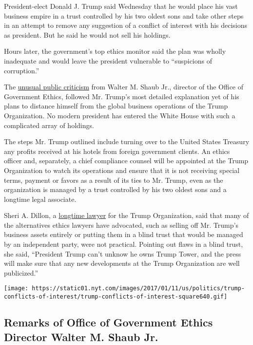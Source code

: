 President-elect Donald J. Trump said Wednesday that he would place his
vast business empire in a trust controlled by his two oldest sons and
take other steps in an attempt to remove any suggestion of a conflict of
interest with his decisions as president. But he said he would not sell
his holdings.

Hours later, the government's top ethics monitor said the plan was
wholly inadequate and would leave the president vulnerable to
``suspicions of corruption.''

The
\href{https://www.documentcloud.org/documents/3280275-Remarks-of-W-M-Shaub-Jr.html}{unusual
public criticism} from Walter M. Shaub Jr., director of the Office of
Government Ethics, followed Mr. Trump's most detailed explanation yet of
his plans to distance himself from the global business operations of the
Trump Organization. No modern president has entered the White House with
such a complicated array of holdings.

The steps Mr. Trump outlined include turning over to the United States
Treasury any profits received at his hotels from foreign government
clients. An ethics officer and, separately, a chief compliance counsel
will be appointed at the Trump Organization to watch its operations and
ensure that it is not receiving special terms, payment or favors as a
result of its ties to Mr. Trump, even as the organization is managed by
a trust controlled by his two oldest sons and a longtime legal
associate.

Sheri A. Dillon, a
\href{https://www.donaldjtrump.com/press-releases/donald-j.-trumps-u.s.-federal-income-tax-returns}{longtime
lawyer} for the Trump Organization, said that many of the alternatives
ethics lawyers have advocated, such as selling off Mr. Trump's business
assets entirely or putting them in a blind trust that would be managed
by an independent party, were not practical. Pointing out flaws in a
blind trust, she said, ``President Trump can't unknow he owns Trump
Tower, and the press will make sure that any new developments at the
Trump Organization are well publicized.''

\href{https://www.nytimes.com/interactive/2017/01/11/us/politics/trump-conflicts-of-interest.html}{}

\texttt{[image: https://static01.nyt.com/images/2017/01/11/us/politics/trump-conflicts-of-interest/trump-conflicts-of-interest-square640.gif]}

\hypertarget{remarks-of-office-of-government-ethics-director-walter-m-shaub-jr}{%
\subsection{Remarks of Office of Government Ethics Director Walter M.
Shaub
Jr.}\label{remarks-of-office-of-government-ethics-director-walter-m-shaub-jr}}

